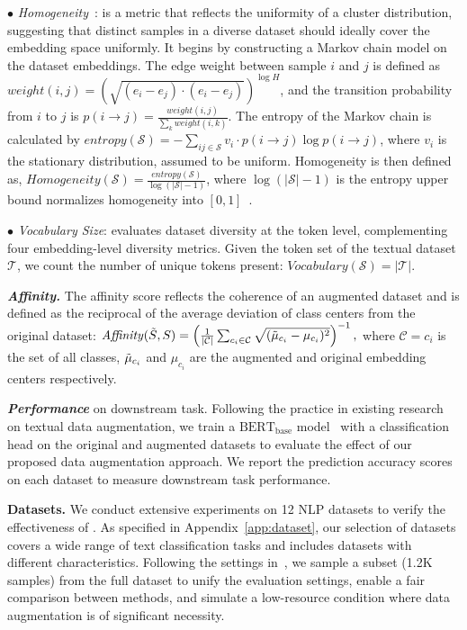 $\bullet$ \textit{Homogeneity}~\cite{lai2020diversity}: is a metric that reflects the uniformity of a cluster distribution, suggesting that distinct samples in a diverse dataset should ideally cover the embedding space uniformly. 
    It begins by constructing a Markov chain model on the dataset embeddings. 
    The edge weight between sample \(i\) and \(j\) is defined as \(weight(i,j) = \left(\sqrt{(e_i - e_j) \cdot (e_i - e_j)}\right)^{\log{H}}\), and the transition probability from \(i\) to \(j\) is \(p(i \rightarrow j) = \frac{weight(i,j)}{\sum_{k} weight(i,k)}.\) 
    The entropy of the Markov chain is calculated by \(entropy(\mathcal{S}) = - \sum_{ij \in \mathcal{S}} v_i \cdot p(i \rightarrow j) \log{p(i \rightarrow j)}\), where \(v_i\) is the stationary distribution, assumed to be uniform. Homogeneity is then defined as, 
        \(\mathit{Homogeneity}(\mathcal{S}) = \frac{entropy(\mathcal{S})}{\log{(|\mathcal{S}|-1)}}\), 
    where \(\log{(|\mathcal{S}|-1)}\) is the entropy upper bound normalizes homogeneity into \([0,1]\)~\cite{lai2020diversity}. 
    
$\bullet$ \textit{Vocabulary Size}: evaluates dataset diversity at the token level, complementing four embedding-level diversity metrics. Given the token set of the textual dataset \(\mathcal{T}\), we count the number of unique tokens present: 
        \(\mathit{Vocabulary}(\mathcal{S}) = |\mathcal{T}|\). 



\noindent\textit{\textbf{Affinity.}} The affinity score reflects the coherence of an augmented dataset and is defined as the reciprocal of the average deviation of class centers from the original dataset: 
$
    \mathit{Affinity}(\Tilde{S}, S) = \left(\frac{1}{|\mathcal{C}|} \sum_{c_i \in \mathcal{C}} \sqrt{(\Tilde{\mu}_{c_i} - \mu_{c_i})^2}\right)^{-1},
$
where \(\mathcal{C}={c_i}\) is the set of all classes, \(\Tilde{\mu}_{c_i}\) and \(\mu_{c_i}\) are the augmented and original embedding centers respectively.

\noindent\textit{\textbf{Performance}} on downstream task. 
Following the practice in existing research on textual data augmentation, we train a \(\text{BERT}_{\text{base}}\) model~\cite{kenton2019bert} with a classification head on the original and augmented datasets to evaluate the effect of our proposed data augmentation approach. 
We report the prediction accuracy scores on each dataset to measure downstream task performance.

\noindent\textbf{Datasets.} 
We conduct extensive experiments on 12 NLP datasets to verify the effectiveness of \Methodnamec. 
As specified in Appendix~\ref{app:dataset}, 
our selection of datasets covers a wide range of text classification tasks and includes datasets with different characteristics. 
Following the settings in~\cite{yoo2021gpt3mix}, we sample a subset (1.2K samples) from the full dataset to unify the evaluation settings, enable a fair comparison between methods, and simulate a low-resource condition where data augmentation is of significant necessity. 




